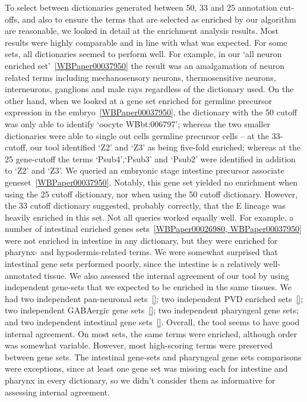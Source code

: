 \documentclass[linenumbers, doublespacing]{bmcart}
\begin{document}
	To select between dictionaries generated between 50, 33 and 25 annotation cut-offs, and also to ensure the terms that are selected as enriched by our algorithm are reasonable, we looked in detail at the enrichment analysis results. 
	Most results were highly comparable and in line with what was expected. For some sets, all dictionaries seemed to perform well. For example, in our `all neuron enriched set'~\ref{WBPaper00037950} the result was an amalgamation of neuron related terms including mechanosensory neurons, thermosensitive neurons, interneurons, ganglions and male rays regardless of the dictionary used. On the other hand, when we looked at a gene set enriched for germline precursor expression in the embryo~\ref{WBPaper00037950}, the dictionary with the 50 cutoff was only able to identify `oocyte WBbt:006797'; whereas the two smaller dictionaries were able to single out cells germline precursor cells -- at the 33-cutoff, our tool identified `Z2' and `Z3' as being five-fold enriched; whereas at the 25 gene-cutoff the terms `Psub4',`Psub3' and `Psub2' were identified in addition to `Z2' and `Z3'.
	We queried an embryonic stage intestine precursor associate geneset~\ref{WBPaper00037950}. Notably, this gene set yielded no enrichment when using the 25 cutoff dictionary, nor when using the 50 cutoff dictionary. However, the 33 cutoff dictionary suggested, probably correctly, that the E lineage was heavily enriched in this set. 
	Not all queries worked equally well. For example, a number of intestinal enriched genes sets~\ref{WBPaper00026980, WBPaper00037950} were not enriched in intestine in any dictionary, but they were enriched for pharynx- and hypodermis-related terms. We were somewhat surprised that intestinal gene sets performed poorly, since the intestine is a relatively well-annotated tissue.
	We also assessed the internal agreement of our tool by using independent gene-sets that we expected to be enriched in the same tissues. We had two independent pan-neuronal sets~\ref{}; two independent PVD enriched sets~\ref{}; two independent GABAergic gene sets~\ref{}; two independent pharyngeal gene sets; and two independent intestinal gene sets~\ref{}. Overall, the tool seems to have good internal agreement. On most sets, the same terms were enriched, although order was somewhat variable. However, most high-scoring terms were preserved between gene sets. The intestinal gene-sets and pharyngeal gene sets comparisons were exceptions, since at least one gene set was missing each for intestine and pharynx in every dictionary, so we didn't consider them as informative for assessing internal agreement. 
	
\end{document}
